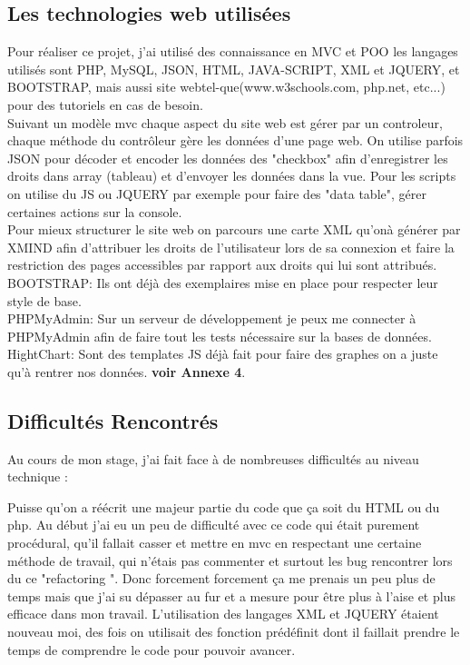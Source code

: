 \subsection{Les technologies web utilisées}
Pour réaliser ce projet, j'ai utilisé des connaissance en MVC et POO les langages utilisés sont PHP, MySQL, JSON, HTML, JAVA-SCRIPT, XML et JQUERY, et BOOTSTRAP, mais aussi site webtel-que(www.w3schools.com, php.net, etc...) pour des tutoriels en cas de besoin.\\
Suivant un modèle mvc chaque aspect du site web est gérer par un controleur, chaque méthode du contrôleur gère les données d'une page web. On utilise parfois JSON  pour décoder et encoder les données  des "checkbox" afin d'enregistrer les droits dans array (tableau) et d'envoyer les données dans la vue.
Pour les scripts on utilise du JS ou JQUERY par exemple pour faire des "data table", gérer certaines actions sur la console.\\
Pour mieux structurer le site web on parcours une carte XML qu'onà  générer par XMIND afin d'attribuer les droits de l'utilisateur lors de sa connexion et faire la restriction des pages accessibles par rapport aux droits qui lui sont attribués.\\
BOOTSTRAP: Ils ont déjà des exemplaires mise en place pour respecter leur style de base.\\
PHPMyAdmin: Sur un serveur de développement je peux me connecter à PHPMyAdmin afin de faire tout les tests nécessaire sur la bases de données.
HightChart: Sont des templates JS déjà fait pour faire des graphes on a juste qu'à rentrer nos données. \textbf{voir Annexe 4}. 

\subsection{Difficultés Rencontrés}
Au cours de mon stage, j’ai fait face à de nombreuses difficultés au niveau technique :

Puisse qu'on a réécrit une majeur partie du code que ça soit du HTML ou du php. 
Au début j'ai eu un peu de difficulté avec ce code qui était purement procédural, qu'il fallait casser et mettre en mvc en respectant une certaine méthode de travail, qui n'étais pas commenter
et surtout les bug rencontrer lors du ce "refactoring ".
Donc forcement forcement ça me prenais un peu plus de temps mais que j'ai su dépasser au fur et a mesure pour être plus à l'aise et plus efficace dans mon travail.
L'utilisation des langages XML et JQUERY étaient nouveau moi, des fois on utilisait des fonction prédéfinit dont il faillait prendre le temps de comprendre le code pour pouvoir avancer.   

























